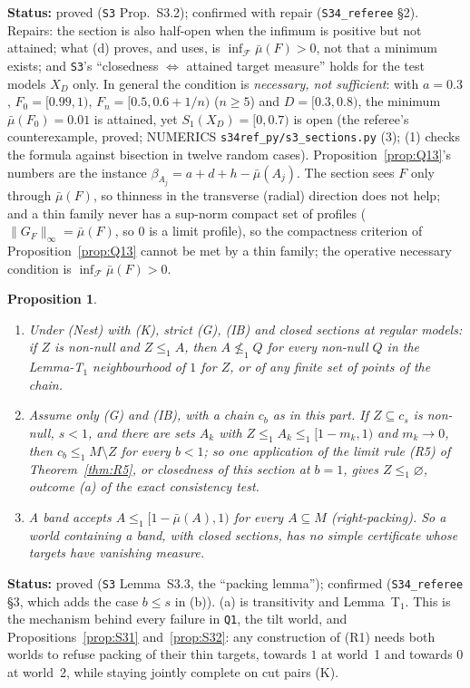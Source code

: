 \documentclass[11pt]{article}
\newtheorem{proposition}[theorem]{Proposition}
\theoremstyle{definition}
\theoremstyle{remark}
\newcommand{\src}[1]{\texttt{#1}}
\newcommand{\status}[1]{\par\smallskip\noindent\textbf{Status:} #1\par\smallskip}
\begin{document}
\status{proved (\src{S3} Prop.~S3.2); confirmed with repair (\src{S34\_referee} \S2). Repairs: the section is also half-open when the infimum is positive but not attained; what (d) proves, and uses, is $\inf_{\mathcal F}\bar\mu(F)>0$, not that a minimum exists; and \src{S3}'s ``closedness $\iff$ attained target measure'' holds for the test models $X_D$ only. In general the condition is \emph{necessary, not sufficient}: with $a=0.3$, $F_0=[0.99,1)$, $F_n=[0.5,0.6+1/n)$ ($n\ge5$) and $D=[0.3,0.8)$, the minimum $\bar\mu(F_0)=0.01$ is attained, yet $S_1(X_D)=[0,0.7)$ is open (the referee's counterexample, proved; NUMERICS \src{s34ref\_py/s3\_sections.py} (3); (1) checks the formula against bisection in twelve random cases). Proposition~\ref{prop:Q13}'s numbers are the instance $\beta_{A_j}=a+d+h-\bar\mu(A_j)$. The section sees $F$ only through $\bar\mu(F)$, so thinness in the transverse (radial) direction does not help; and a thin family never has a sup-norm compact set of profiles ($\|G_F\|_\infty=\bar\mu(F)$, so $0$ is a limit profile), so the compactness criterion of Proposition~\ref{prop:Q13} cannot be met by a thin family; the operative necessary condition is $\inf_{\mathcal F}\bar\mu(F)>0$.}

\begin{proposition}\label{prop:S33}
\begin{enumerate}[leftmargin=*,label=(\alph*)]
\item Under (Nest) with (K), strict (G), (IB) and closed sections at regular models: if $Z$ is non-null and $Z\le_1A$, then $A\not\le_1Q$ for every non-null $Q$ in the Lemma-T$_1$ neighbourhood of $1$ for $Z$, or of any finite set of points of the chain.
\item Assume only (G) and (IB), with a chain $c_b$ as in this part. If $Z\subseteq c_s$ is non-null, $s<1$, and there are sets $A_k$ with $Z\le_1A_k\le_1[1-m_k,1)$ and $m_k\to0$, then $c_b\le_1M\setminus Z$ for every $b<1$; so one application of the limit rule (R5) of Theorem~\ref{thm:R5}, or closedness of this section at $b=1$, gives $Z\le_1\varnothing$, outcome (a) of the exact consistency test.
\item A band accepts $A\le_1[1-\bar\mu(A),1)$ for every $A\subseteq M$ (\emph{right-packing}). So a world containing a band, with closed sections, has no simple certificate whose targets have vanishing measure.
\end{enumerate}
\end{proposition}
\status{proved (\src{S3} Lemma~S3.3, the ``packing lemma''); confirmed (\src{S34\_referee} \S3, which adds the case $b\le s$ in (b)). (a) is transitivity and Lemma~T$_1$. This is the mechanism behind every failure in \src{Q1}, the tilt world, and Propositions~\ref{prop:S31} and~\ref{prop:S32}: any construction of (R1) needs both worlds to refuse packing of their thin targets, towards $1$ at world~1 and towards $0$ at world~2, while staying jointly complete on cut pairs (K).}
\end{document}

